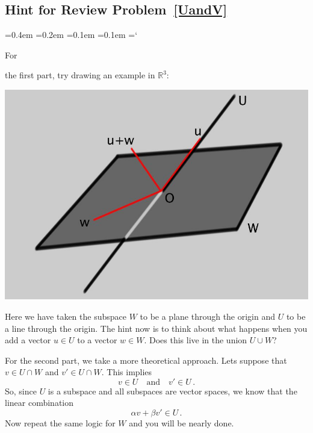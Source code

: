 
\subsection*{Hint for Review Problem~\ref{UandV}}

{\ttfamily
{}\font=0.4em
\font=0.2em
\font=0.1em
\font=0.1em
\hyphenchar\font=`\-

\hypertarget{subspaces_and_spanning_sets_hint}{For} the first part, try drawing an example in ${\mathbb R}^3$:
\begin{center}
\includegraphics[alt={A plane W and line U both through the origin, with vectors w and u respectively.  Their sum is u+w.},scale=.35]{UunionW.jpg}
\end{center}
Here we have taken the subspace $W$ to be a plane through the origin and
$U$ to be a line through the origin. The hint now is to think about what happens when 
you add a vector $u\in U$ to a vector $w\in W$. Does this live in the union $U\cup W$?

For the second part, we take a more theoretical approach. Lets suppose that $v\in U\cap W$ and $v'\in U\cap W$. This implies
\[
v\in U \quad \mbox{and} \quad v'\in U\, .
\]
So, since $U$ is a subspace and all subspaces are vector spaces, we know that the linear
combination
\[
\alpha v+\beta v'\in U\, .
\]
Now repeat the same logic for $W$ and you will be nearly done.


} %

